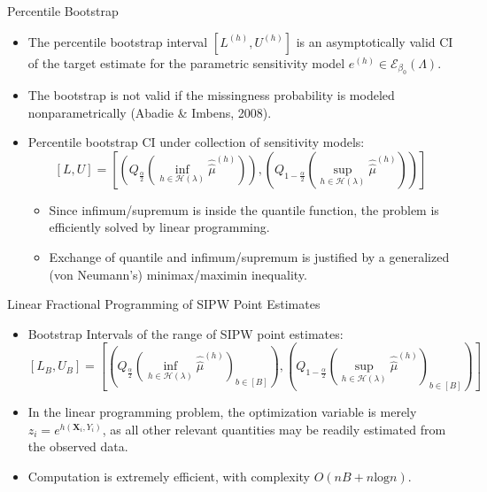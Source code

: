 \documentclass{beamer}
\begin{document}

\begin{frame}{Percentile Bootstrap}

\begin{itemize}
  \itemsep8pt
  \item The percentile bootstrap interval $[L^{(h)}, U^{(h)}]$ is an
    asymptotically valid CI of the target estimate for the parametric
    sensitivity model $e^{(h)} \in \mathcal{E}_{\beta_0}(\Lambda)$.
  \item The bootstrap is not valid if the missingness probability is modeled
    nonparametrically (Abadie \& Imbens, 2008).
  \item Percentile bootstrap CI under collection of sensitivity models:
    \[
      [L, U] = \left[\left(Q_{\frac{\alpha}{2}}(\inf_{h \in
        \mathcal{H}(\lambda)} \hat{\hat{\mu}}^{(h)})\right), \left(Q_{1 -
        \frac{\alpha}{2}}(\sup_{h \in \mathcal{H}(\lambda)}
        \hat{\hat{\mu}}^{(h)})\right)\right]
    \]
    \begin{itemize}
      \item \small Since infimum/supremum is inside the quantile function, the
        problem is efficiently solved by linear programming.
      \item \small Exchange of quantile and infimum/supremum is justified by a
        generalized (von Neumann's) minimax/maximin inequality.
    \end{itemize}
\end{itemize}

\end{frame}


\begin{frame}{Linear Fractional Programming of SIPW Point Estimates}

\begin{itemize}
  \itemsep12pt
  \item Bootstrap Intervals of the range of SIPW point estimates:
    \[
      [L_B, U_B] = \left[\left(Q_{\frac{\alpha}{2}}(\inf_{h \in
        \mathcal{H}(\lambda)} \hat{\hat{\mu}}^{(h)})_{b \in [B]}\right),
        \left(Q_{1 - \frac{\alpha}{2}}(\sup_{h \in \mathcal{H}(\lambda)}
        \hat{\hat{\mu}}^{(h)})_{b \in [B]}\right)\right]
    \]
  \item In the linear programming problem, the optimization variable is merely
    $z_i = e^{h(\bm{X}_i, Y_i)}$, as all other relevant quantities may be
    readily estimated from the observed data.
  \item Computation is extremely efficient, with complexity $O(nB + n
    \text{log}n)$.
\end{itemize}

\end{frame}
\end{document}
